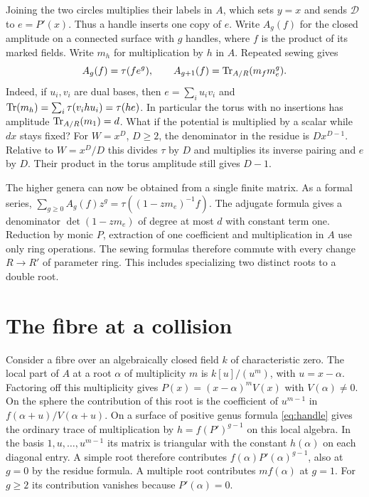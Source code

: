 \documentclass{momentum}
\begin{document}
Joining the two circles multiplies their labels in \(A\), which sets
\(y=x\) and sends \(\mathcal D\) to \(e=P'(x)\). Thus a handle inserts
one copy of \(e\). Write \(A_g(f)\) for the closed amplitude on a
connected surface with \(g\) handles, where \(f\) is the product of
its marked fields. Write \(m_h\) for multiplication by \(h\) in \(A\).
Repeated sewing gives
\begin{equation}
 A_g(f)=\tau(fe^g),\qquad
 A_{g+1}(f)=\operatorname{Tr}_{A/R}(m_fm_e^g).
 \label{eq:handle}
\end{equation}
Indeed, if \(u_i,v_i\) are dual bases, then
\(e=\sum_i u_i v_i\) and \(\operatorname{Tr}(m_h)=\sum_i\tau(v_i h u_i)=\tau(he)\).
In particular the torus with no insertions has amplitude
\(\operatorname{Tr}_{A/R}(m_1)=d\).
What if the potential is multiplied by a scalar while \(dx\) stays fixed?
For \(W=x^D\), \(D\ge2\), the denominator in the residue is
\(D x^{D-1}\). Relative to \(W=x^D/D\) this divides \(\tau\) by \(D\)
and multiplies its inverse pairing and \(e\) by \(D\). Their product
in the torus amplitude still gives \(D-1\).

The higher genera can now be obtained from a single finite matrix.
As a formal series, \(\sum_{g\ge0}A_g(f)z^g=\tau((1-zm_e)^{-1}f)\).
The adjugate formula gives a denominator \(\det(1-zm_e)\) of degree
at most \(d\) with constant term one. Reduction by monic \(P\), extraction
of one coefficient and multiplication in \(A\) use only ring operations.
The sewing formulas therefore commute with every change \(R\to R'\)
of parameter ring. This includes specializing two distinct roots to a
double root.

\section{The fibre at a collision}

Consider a fibre over an algebraically closed field \(k\) of characteristic zero.
The local part of \(A\) at a root \(\alpha\) of multiplicity \(m\) is
\(k[u]/(u^m)\), with \(u=x-\alpha\). Factoring off this multiplicity gives
\(P(x)=(x-\alpha)^m V(x)\) with \(V(\alpha)\ne0\). On the sphere the contribution of this root
is the coefficient of \(u^{m-1}\) in \(f(\alpha+u)/V(\alpha+u)\).
On a surface of positive genus formula \eqref{eq:handle} gives the
ordinary trace of multiplication by \(h=f(P')^{g-1}\) on this local
algebra. In the basis \(1,u,\ldots,u^{m-1}\) its matrix is triangular
with the constant \(h(\alpha)\) on each diagonal entry. A simple root
therefore contributes \(f(\alpha)P'(\alpha)^{g-1}\), also at \(g=0\)
by the residue formula. A multiple root contributes \(m f(\alpha)\)
at \(g=1\). For \(g\ge2\) its contribution vanishes because \(P'(\alpha)=0\).
\end{document}
